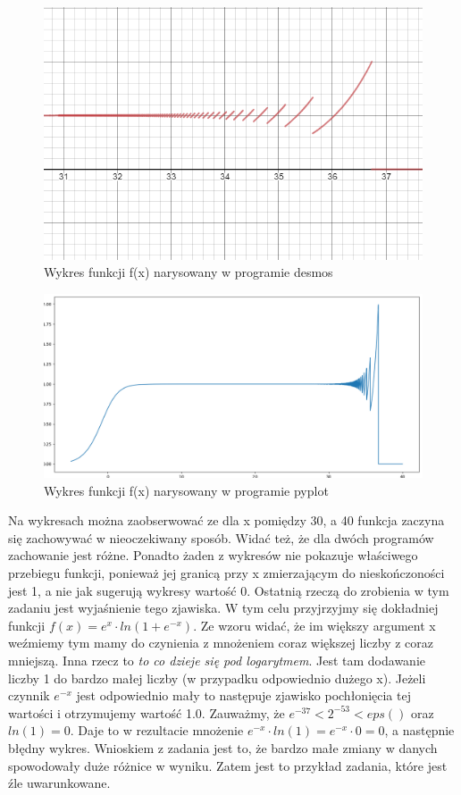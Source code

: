 \documentclass[]{article}
\begin{document}
	
	\begin{figure}[!htbp]
		\includegraphics[scale=0.9]{task2_plot_desmos_broken}
		\centering
		\caption{Wykres funkcji f(x) narysowany w programie desmos}
	\end{figure}
	\clearpage
	\begin{figure}[!htbp]
		\includegraphics[scale=0.5]{task2_plot_pyplot}
		\centering
		\caption{Wykres funkcji f(x) narysowany w programie pyplot}
	\end{figure}

	Na wykresach można zaobserwować ze dla x pomiędzy 30, a 40 funkcja zaczyna się zachowywać w nieoczekiwany sposób. Widać też, że dla dwóch programów zachowanie jest różne. Ponadto żaden z wykresów nie pokazuje właściwego przebiegu funkcji, ponieważ jej granicą przy x zmierzającym do nieskończoności jest 1, a nie jak sugerują wykresy wartość 0. Ostatnią rzeczą do zrobienia w tym zadaniu jest wyjaśnienie tego zjawiska. W tym celu przyjrzyjmy się dokładniej funkcji  $f(x) = e^{x}\cdot ln(1+e^{-x})$. Ze wzoru widać, że im większy argument x weźmiemy tym mamy do czynienia z mnożeniem coraz większej liczby z coraz mniejszą. Inna rzecz to \textit{to co dzieje się pod logarytmem}.
	Jest tam dodawanie liczby 1 do bardzo małej liczby (w przypadku odpowiednio dużego x). Jeżeli czynnik $e^{-x}$ jest odpowiednio mały to następuje zjawisko pochłonięcia tej wartości i otrzymujemy wartość 1.0. Zauważmy, że $e^{-37} < 2^{-53} < eps()$ oraz $ln(1) = 0$. Daje to w rezultacie mnożenie $e^{-x}\cdot ln(1)=e^{-x}\cdot0 = 0$, a następnie błędny wykres. Wnioskiem z zadania jest to, że bardzo małe zmiany w danych spowodowały duże różnice w wyniku. Zatem jest to przykład zadania, które jest źle uwarunkowane.
	
\end{document}
